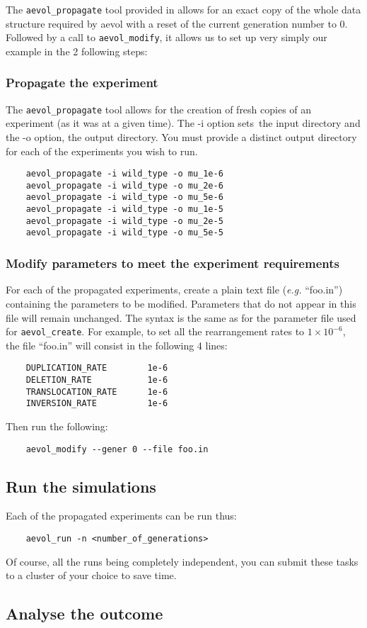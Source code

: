 The \verb?aevol_propagate? tool provided in \aevol{} allows for an exact copy of the whole data structure required by aevol with a reset of the current generation number to 0. Followed by a call to \verb?aevol_modify?, it allows us to set up very simply our example in the 2 following steps:


\subsubsection{Propagate the experiment}
The \verb?aevol_propagate? tool allows for the creation of fresh copies of an experiment (as it was at a given time). The -i option sets the input directory and the -o option, the output directory. You must provide a distinct output directory for each of the experiments you wish to run.
\begin{verbatim}
	aevol_propagate -i wild_type -o mu_1e-6
	aevol_propagate -i wild_type -o mu_2e-6
	aevol_propagate -i wild_type -o mu_5e-6
	aevol_propagate -i wild_type -o mu_1e-5
	aevol_propagate -i wild_type -o mu_2e-5
	aevol_propagate -i wild_type -o mu_5e-5
\end{verbatim}

\subsubsection{Modify parameters to meet the experiment requirements}
For each of the propagated experiments, create a plain text file (\emph{e.g.} ``foo.in'') containing the parameters to be modified. Parameters that do not appear in this file will remain unchanged. The syntax is the same as for the parameter file used for \verb?aevol_create?. For example, to set all the rearrangement rates to $1\times10^{-6}$, the file ``foo.in'' will consist in the following 4 lines:
\begin{verbatim}
    DUPLICATION_RATE        1e-6
    DELETION_RATE           1e-6
    TRANSLOCATION_RATE      1e-6
    INVERSION_RATE          1e-6
\end{verbatim}
Then run the following:
\begin{verbatim}
	aevol_modify --gener 0 --file foo.in
\end{verbatim}



\subsection{Run the simulations}
Each of the propagated experiments can be run thus:
\begin{verbatim}
	aevol_run -n <number_of_generations>
\end{verbatim}
Of course, all the runs being completely independent, you can submit these tasks to a cluster of your choice to save time.


\subsection{Analyse the outcome}

\clearemptydoublepage






